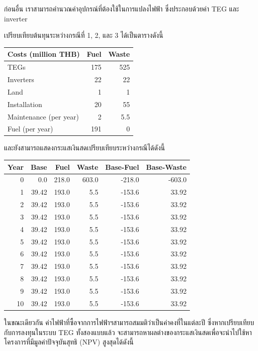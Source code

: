 \documentclass[a4paper,nobib,openany]{tufte-book}
\begin{document}
ก่อนอื่น เราสามารถคำนวณค่าอุปกรณ์ที่ต้องใช้ในการแปลงไฟฟ้า
ซึ่งประกอบด้วยค่า TEG และ inverter

เปรียบเทียบต้นทุนระหว่างกรณีที่ 1, 2, และ 3 ได้เป็นตารางดังนี้

\begin{center}
\begin{tabular}{lrr}
\toprule
Costs (million THB) & Fuel & Waste\\
\midrule
TEGs & 175 & 525\\
Inverters & 22 & 22\\
Land & 1 & 1\\
Installation & 20 & 55\\
Maintenance (per year) & 2 & 5.5\\
Fuel (per year) & 191 & 0\\
\bottomrule
\end{tabular}
\end{center}


และยังสามารถแสดงกระแสเงินสดเปรียบเทียบระหว่างกรณีได้ดังนี้

\begin{center}
\begin{tabular}{rrrrrr}
\toprule
Year & Base & Fuel & Waste & Base-Fuel & Base-Waste\\
\midrule
0 & 0.0 & 218.0 & 603.0 & -218.0 & -603.0\\
1 & 39.42 & 193.0 & 5.5 & -153.6 & 33.92\\
2 & 39.42 & 193.0 & 5.5 & -153.6 & 33.92\\
3 & 39.42 & 193.0 & 5.5 & -153.6 & 33.92\\
4 & 39.42 & 193.0 & 5.5 & -153.6 & 33.92\\
5 & 39.42 & 193.0 & 5.5 & -153.6 & 33.92\\
6 & 39.42 & 193.0 & 5.5 & -153.6 & 33.92\\
7 & 39.42 & 193.0 & 5.5 & -153.6 & 33.92\\
8 & 39.42 & 193.0 & 5.5 & -153.6 & 33.92\\
9 & 39.42 & 193.0 & 5.5 & -153.6 & 33.92\\
10 & 39.42 & 193.0 & 5.5 & -153.6 & 33.92\\
\bottomrule
\end{tabular}
\end{center}

ในขณะเดียวกัน ค่าไฟฟ้าที่ซื้อจากการไฟฟ้าฯสามารถสมมติว่าเป็นค่าคงที่ในแต่ละปี
ซึ่งหากเปรียบเทียบกับการลงทุนในระบบ TEG ทั้งสองแบบแล้ว
จะสามารถหาผลต่างของกระแสเงินสดเพื่อจะนำไปใช้หาโครงการที่มีมูลค่าปัจจุบันสุทธิ
(NPV) สูงสุดได้ดังนี้
\end{document}
